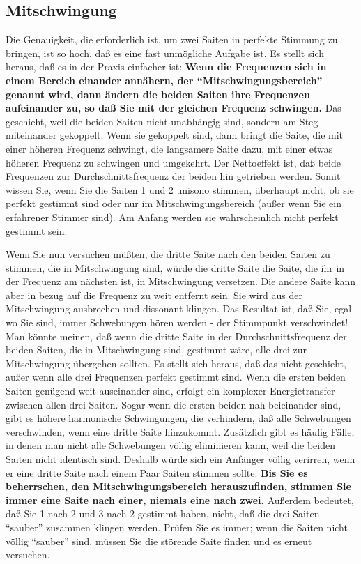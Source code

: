 \hypertarget{c2_5e}{}\hypertarget{c2_5_mits}{}

\subsection{Mitschwingung}

Die Genauigkeit, die erforderlich ist, um zwei Saiten in perfekte Stimmung zu bringen, ist so hoch, daß es eine fast unmögliche Aufgabe ist.
 Es stellt sich heraus, daß es in der Praxis einfacher ist: \textbf{Wenn die Frequenzen sich in einem Bereich einander annähern, der \enquote{Mitschwingungsbereich} genannt wird, dann ändern die beiden Saiten ihre Frequenzen aufeinander zu, so daß Sie mit der gleichen Frequenz schwingen.}
 Das geschieht, weil die beiden Saiten nicht unabhängig sind, sondern am Steg miteinander gekoppelt.
 Wenn sie gekoppelt sind, dann bringt die Saite, die mit einer höheren Frequenz schwingt, die langsamere Saite dazu, mit einer etwas höheren Frequenz zu schwingen und umgekehrt.
 Der Nettoeffekt ist, daß beide Frequenzen zur Durchschnittsfrequenz der beiden hin getrieben werden.
 Somit wissen Sie, wenn Sie die Saiten 1 und 2 unisono stimmen, überhaupt nicht, ob sie perfekt gestimmt sind oder nur im Mitschwingungsbereich (außer wenn Sie ein erfahrener Stimmer sind).
 Am Anfang werden sie wahrscheinlich nicht perfekt gestimmt sein.
 

Wenn Sie nun versuchen müßten, die dritte Saite nach den beiden Saiten zu stimmen, die in Mitschwingung sind, würde die dritte Saite die Saite, die ihr in der Frequenz am nächsten ist, in Mitschwingung versetzen.
 Die andere Saite kann aber in bezug auf die Frequenz zu weit entfernt sein.
 Sie wird aus der Mitschwingung ausbrechen und dissonant klingen.
 Das Resultat ist, daß Sie, egal wo Sie sind, immer Schwebungen hören werden - der Stimmpunkt verschwindet!
 Man könnte meinen, daß wenn die dritte Saite in der Durchschnittsfrequenz der beiden Saiten, die in Mitschwingung sind, gestimmt wäre, alle drei zur Mitschwingung übergehen sollten.
 Es stellt sich heraus, daß das nicht geschieht, außer wenn alle drei Frequenzen perfekt gestimmt sind.
 Wenn die ersten beiden Saiten genügend weit auseinander sind, erfolgt ein komplexer Energietransfer zwischen allen drei Saiten.
 Sogar wenn die ersten beiden nah beieinander sind, gibt es höhere harmonische Schwingungen, die verhindern, daß alle Schwebungen verschwinden, wenn eine dritte Saite hinzukommt.
 Zusätzlich gibt es häufig Fälle, in denen man nicht alle Schwebungen völlig eliminieren kann, weil die beiden Saiten nicht identisch sind.
 Deshalb würde sich ein Anfänger völlig verirren, wenn er eine dritte Saite nach einem Paar Saiten stimmen sollte.
 \textbf{Bis Sie es beherrschen, den Mitschwingungsbereich herauszufinden, stimmen Sie immer eine Saite nach einer, niemals eine nach zwei.}
 Außerdem bedeutet, daß Sie 1 nach 2 und 3 nach 2 gestimmt haben, nicht, daß die drei Saiten \enquote{sauber} zusammen klingen werden.
 Prüfen Sie es immer; wenn die Saiten nicht völlig \enquote{sauber} sind, müssen Sie die störende Saite finden und es erneut versuchen.
 

